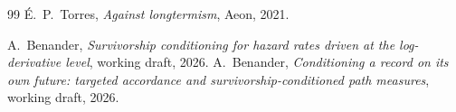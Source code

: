 \documentclass[11pt]{article}
\theoremstyle{plain}
\theoremstyle{definition}
\theoremstyle{remark}
\begin{document}
\begin{thebibliography}{99}
 \'E.~P.~Torres, \emph{Against longtermism},
Aeon, 2021.

 A.~Benander, \emph{Survivorship conditioning for hazard rates driven at the log-derivative level}, working draft, 2026.
 A.~Benander, \emph{Conditioning a record on its own future: targeted accordance and survivorship-conditioned path measures}, working draft, 2026.

\end{thebibliography}
\end{document}
